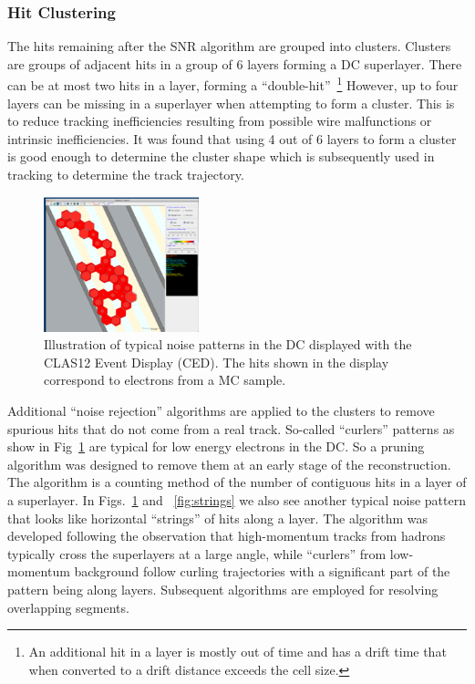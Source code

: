 \subsubsection{Hit Clustering}
The hits remaining after the SNR
algorithm are grouped into clusters.
Clusters are groups of adjacent hits in a group of 6 layers forming a DC superlayer.  There can be at most
two hits in a layer, forming a ``double-hit''~\footnote{An additional hit in a layer is mostly out of time and has 
a drift time that when converted to a drift distance exceeds the cell size. }  However, up to four layers can be missing in a superlayer
when attempting to form a cluster.  This is to reduce tracking inefficiencies resulting from possible wire malfunctions or
intrinsic inefficiencies. It was found that using 4 out of 6 layers to form a cluster is good enough
to determine the cluster shape which is subsequently used in tracking to determine the track trajectory. 
\begin{figure}
\centering
\includegraphics[width=0.4\textwidth]{pics/elooper.png}
\caption{
Illustration of typical noise patterns in the DC displayed with the CLAS12 Event Display (CED). 
The hits shown in the display correspond to electrons from a MC sample.
}
\label{fig:eloop}
\end{figure}

Additional ``noise rejection'' algorithms are applied to the clusters to remove spurious hits
that do not come from a real track. 
So-called ``curlers'' patterns as show in Fig~\ref{fig:eloop} are typical for low energy electrons  in the DC.   So a pruning algorithm was designed to remove them at an early stage of the reconstruction. The  algorithm is a counting method of the number of contiguous hits in a layer of a superlayer.  In Figs.~\ref{fig:eloop} and ~\ref{fig:strings} we also see another typical noise pattern that looks like horizontal ``strings'' of hits along a layer.  The algorithm was developed following  the observation that high-momentum tracks from hadrons typically cross the superlayers at a large angle,
while ``curlers'' from low-momentum background follow curling trajectories with a significant part of the
pattern being along layers.
Subsequent algorithms  are employed for resolving overlapping segments.   


